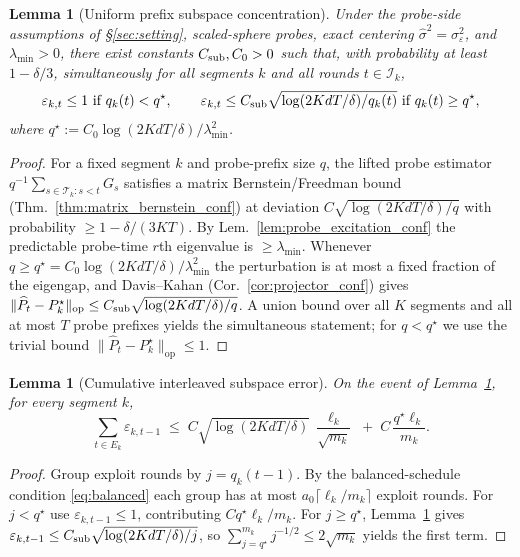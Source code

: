 \documentclass{article}
\newcommand{\op}{\mathrm{op}}
\newcommand{\cT}{\mathcal{T}}
\newcommand{\cI}{\mathcal{I}}
\newtheorem{lemma}[theorem]{Lemma}
\begin{document}
\begin{lemma}[Uniform prefix subspace concentration]
\label{lem:prefix_subspace}
Under the probe-side assumptions of \S\ref{sec:setting}, scaled-sphere
probes, exact centering $\widehat\sigma^2=\sigma_\varepsilon^2$, and
$\lambda_{\min}>0$, there exist constants $C_{\rm sub},C_0>0$ such
that, with probability at least $1-\delta/3$, simultaneously for all
segments $k$ and all rounds $t\in\cI_k$,
\[
\varepsilon_{k,t}\le 1\text{ if }q_k(t)<q^\star,
\qquad
\varepsilon_{k,t}\le C_{\rm sub}\sqrt{\log(2KdT/\delta)/q_k(t)}
\text{ if }q_k(t)\ge q^\star,
\]
where $q^\star := C_0\log(2KdT/\delta)/\lambda_{\min}^2$.
\end{lemma}
\begin{proof}
For a fixed segment $k$ and probe-prefix size $q$, the lifted probe
estimator $q^{-1}\sum_{s\in\cT_k:s<t}G_s$ satisfies a matrix
Bernstein/Freedman bound (Thm.~\ref{thm:matrix_bernstein_conf}) at
deviation $C\sqrt{\log(2KdT/\delta)/q}$ with probability
$\ge 1-\delta/(3KT)$. By
Lem.~\ref{lem:probe_excitation_conf} the predictable probe-time
$r$th eigenvalue is $\ge\lambda_{\min}$. Whenever
$q\ge q^\star=C_0\log(2KdT/\delta)/\lambda_{\min}^2$ the perturbation
is at most a fixed fraction of the eigengap, and Davis--Kahan
(Cor.~\ref{cor:projector_conf}) gives
$\|\widehat P_t-P_k^\star\|_{\op}\le C_{\rm sub}\sqrt{\log(2KdT/\delta)/q}$.
A union bound over all $K$ segments and all at most $T$ probe
prefixes yields the simultaneous statement; for $q<q^\star$ we use
the trivial bound $\|\widehat P_t-P_k^\star\|_{\op}\le 1$.
\end{proof}

\begin{lemma}[Cumulative interleaved subspace error]
\label{lem:cumulative_interleaved_error}
On the event of Lemma~\ref{lem:prefix_subspace}, for every segment $k$,
\begin{equation}
\sum_{t\in E_k}\varepsilon_{k,t-1}
\;\le\;
C\sqrt{\log(2KdT/\delta)}\,\frac{\ell_k}{\sqrt{m_k}}
\;+\; C\,\frac{q^\star\ell_k}{m_k}.
\label{eq:cumul_eps}
\end{equation}
\end{lemma}
\begin{proof}
Group exploit rounds by $j=q_k(t-1)$. By the balanced-schedule
condition \eqref{eq:balanced} each group has at most
$a_0\lceil\ell_k/m_k\rceil$ exploit rounds. For $j<q^\star$ use
$\varepsilon_{k,t-1}\le 1$, contributing $C q^\star\ell_k/m_k$. For
$j\ge q^\star$, Lemma~\ref{lem:prefix_subspace} gives
$\varepsilon_{k,t-1}\le C_{\rm sub}\sqrt{\log(2KdT/\delta)/j}$, so
$\sum_{j=q^\star}^{m_k}j^{-1/2}\le 2\sqrt{m_k}$ yields the first term.
\end{proof}
\end{document}
